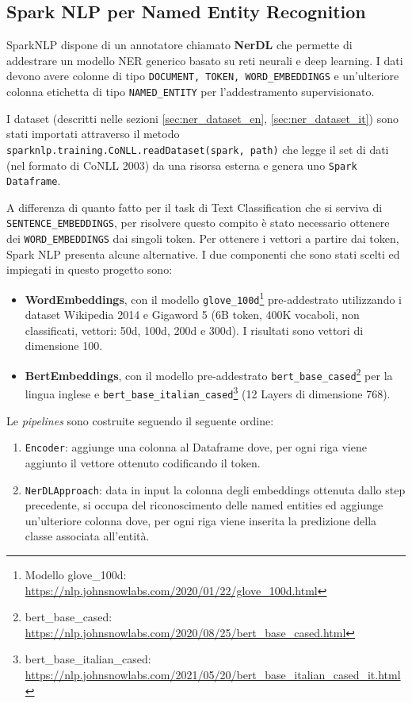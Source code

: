 \subsection{Spark NLP per Named Entity Recognition}
SparkNLP dispone di un annotatore chiamato \textbf{NerDL} che permette di addestrare un modello NER generico basato su reti neurali e deep learning. I dati devono avere colonne di tipo \verb|DOCUMENT, TOKEN, WORD_EMBEDDINGS| e un'ulteriore colonna etichetta di tipo \verb|NAMED_ENTITY| per l'addestramento supervisionato.

I dataset (descritti nelle sezioni \ref{sec:ner_dataset_en}, \ref{sec:ner_dataset_it}) sono stati importati attraverso il metodo \verb|sparknlp.training.CoNLL.readDataset(spark, path)| che legge il set di dati (nel formato di CoNLL 2003) da una risorsa esterna e genera uno \verb|Spark Dataframe|.

A differenza di quanto fatto per il task di Text Classification che si serviva di \verb|SENTENCE_EMBEDDINGS|, per risolvere questo compito è stato necessario ottenere dei \verb|WORD_EMBEDDINGS| dai singoli token. Per ottenere i vettori a partire dai token, Spark NLP presenta alcune alternative. I due componenti che sono stati scelti ed impiegati in questo progetto sono:
\begin{itemize}
    \item \textbf{WordEmbeddings}, con il modello 
    \verb|glove_100d|\footnote{Modello glove\_100d: \href{https://nlp.johnsnowlabs.com/2020/01/22/glove\_100d.html}{https://nlp.johnsnowlabs.com/2020/01/22/glove\_100d.html}} 
    pre-addestrato utilizzando i dataset Wikipedia 2014 e Gigaword 5 (6B token, 400K vocaboli, non classificati, vettori: 50d, 100d, 200d e 300d). I risultati sono vettori di dimensione 100.
    \item \textbf{BertEmbeddings}, con il modello pre-addestrato 
    \verb|bert_base_cased|\footnote{bert\_base\_cased: \href{https://nlp.johnsnowlabs.com/2020/08/25/bert\_base\_cased.html}{https://nlp.johnsnowlabs.com/2020/08/25/bert\_base\_cased.html}} per la lingua inglese e 
    \verb|bert_base_italian_cased|\footnote{bert\_base\_italian\_cased: \href{https://nlp.johnsnowlabs.com/2021/05/20/bert\_base\_italian\_cased\_it.html}{https://nlp.johnsnowlabs.com/2021/05/20/bert\_base\_italian\_cased\_it.html}}
    (12 Layers di dimensione 768).
\end{itemize}
Le \textit{pipelines} sono costruite seguendo il seguente ordine:
\begin{enumerate}
    \item \verb|Encoder|: aggiunge una colonna al Dataframe dove, per ogni riga viene aggiunto il vettore ottenuto codificando il token.
    \item \verb|NerDLApproach|: data in input la colonna degli embeddings ottenuta dallo step precedente, si occupa del riconoscimento delle named entities ed aggiunge un'ulteriore colonna dove, per ogni riga viene inserita la predizione della classe associata all'entità.
\end{enumerate}